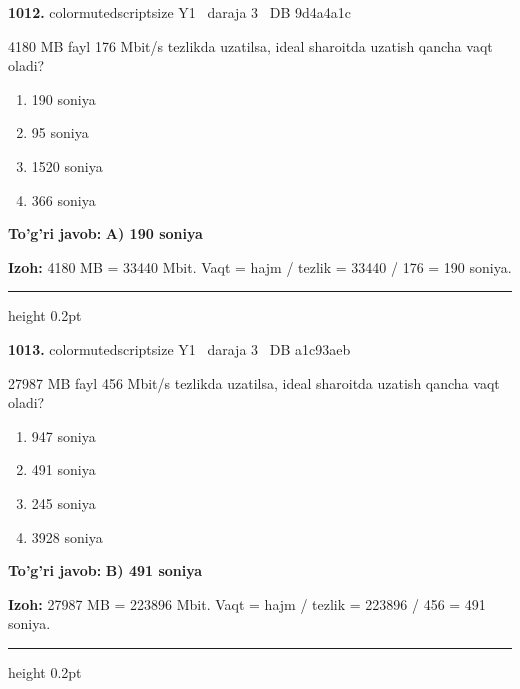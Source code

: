 \documentclass[10pt,a4paper,oneside]{article}
\begin{document}
\noindent\textbf{\color{ink}1012.}  {color{muted}scriptsize Y1 \textbullet\ daraja 3 \textbullet\ DB 9d4a4a1c}
\par
4180 MB fayl 176 Mbit/s tezlikda uzatilsa, ideal sharoitda uzatish qancha vaqt oladi?
\begin{enumerate}[label=\Alph*),leftmargin=9mm]
\item 190 soniya
\item 95 soniya
\item 1520 soniya
\item 366 soniya
\end{enumerate}
\begin{tcolorbox}[enhanced,breakable,colback=teal!4,colframe=teal!50!black,boxrule=0.5pt,arc=1.1mm,left=3mm,right=3mm,top=1.7mm,bottom=1.7mm,before skip=2mm,after skip=2mm]
\textbf{\color{teal}To'g'ri javob:} \textbf{A) 190 soniya}
\par\smallskip
\textbf{Izoh:} 4180 MB = 33440 Mbit. Vaqt = hajm / tezlik = 33440 / 176 = 190 soniya.
\end{tcolorbox}
\vspace{2mm}\hrule height 0.2pt \vspace{3mm}

\noindent\textbf{\color{ink}1013.}  {color{muted}scriptsize Y1 \textbullet\ daraja 3 \textbullet\ DB a1c93aeb}
\par
27987 MB fayl 456 Mbit/s tezlikda uzatilsa, ideal sharoitda uzatish qancha vaqt oladi?
\begin{enumerate}[label=\Alph*),leftmargin=9mm]
\item 947 soniya
\item 491 soniya
\item 245 soniya
\item 3928 soniya
\end{enumerate}
\begin{tcolorbox}[enhanced,breakable,colback=teal!4,colframe=teal!50!black,boxrule=0.5pt,arc=1.1mm,left=3mm,right=3mm,top=1.7mm,bottom=1.7mm,before skip=2mm,after skip=2mm]
\textbf{\color{teal}To'g'ri javob:} \textbf{B) 491 soniya}
\par\smallskip
\textbf{Izoh:} 27987 MB = 223896 Mbit. Vaqt = hajm / tezlik = 223896 / 456 = 491 soniya.
\end{tcolorbox}
\vspace{2mm}\hrule height 0.2pt \vspace{3mm}
\end{document}
